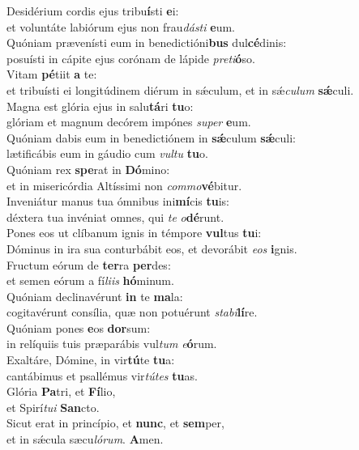 \evenverse Desidérium cordis ejus tribu\textbf{í}sti \textbf{e}i:~\*\\
\evenverse et voluntáte labiórum ejus non frau\textit{dá}\textit{sti} \textbf{e}um.\\
\oddverse Quóniam prævenísti eum in benedictióni\textbf{bus} dul\textbf{cé}dinis:~\*\\
\oddverse posuísti in cápite ejus corónam de lápide \textit{pre}\textit{ti}\textbf{ó}so.\\
\evenverse Vitam \textbf{pé}tiit \textbf{a} te:~\*\\
\evenverse et tribuísti ei longitúdinem diérum in sǽculum, et in sǽ\textit{cu}\textit{lum} \textbf{sǽ}culi.\\
\oddverse Magna est glória ejus in salu\textbf{tá}ri \textbf{tu}o:~\*\\
\oddverse glóriam et magnum decórem impónes \textit{su}\textit{per} \textbf{e}um.\\
\evenverse Quóniam dabis eum in benedictiónem in \textbf{sǽ}culum \textbf{sǽ}culi:~\*\\
\evenverse lætificábis eum in gáudio cum \textit{vul}\textit{tu} \textbf{tu}o.\\
\oddverse Quóniam rex \textbf{spe}rat in \textbf{Dó}mino:~\*\\
\oddverse et in misericórdia Altíssimi non \textit{com}\textit{mo}\textbf{vé}bitur.\\
\evenverse Inveniátur manus tua ómnibus ini\textbf{mí}cis \textbf{tu}is:~\*\\
\evenverse déxtera tua invéniat omnes, qui \textit{te} \textit{o}\textbf{dé}runt.\\
\oddverse Pones eos ut clíbanum ignis in témpore \textbf{vul}tus \textbf{tu}i:~\*\\
\oddverse Dóminus in ira sua conturbábit eos, et devorábit \textit{e}\textit{os} \textbf{i}gnis.\\
\evenverse Fructum eórum de \textbf{ter}ra \textbf{per}des:~\*\\
\evenverse et semen eórum a fí\textit{li}\textit{is} \textbf{hó}minum.\\
\oddverse Quóniam declinavérunt \textbf{in} te \textbf{ma}la:~\*\\
\oddverse cogitavérunt consília, quæ non potuérunt \textit{sta}\textit{bi}\textbf{lí}re.\\
\evenverse Quóniam pones \textbf{e}os \textbf{dor}sum:~\*\\
\evenverse in relíquiis tuis præparábis vul\textit{tum} \textit{e}\textbf{ó}rum.\\
\oddverse Exaltáre, Dómine, in vir\textbf{tú}te \textbf{tu}a:~\*\\
\oddverse cantábimus et psallémus vir\textit{tú}\textit{tes} \textbf{tu}as.\\
\evenverse Glória \textbf{Pa}tri, et \textbf{Fí}lio,~\*\\
\evenverse et Spirí\textit{tu}\textit{i} \textbf{San}cto.\\
\oddverse Sicut erat in princípio, et \textbf{nunc}, et \textbf{sem}per,~\*\\
\oddverse et in sǽcula sæcu\textit{ló}\textit{rum}. \textbf{A}men.\\
